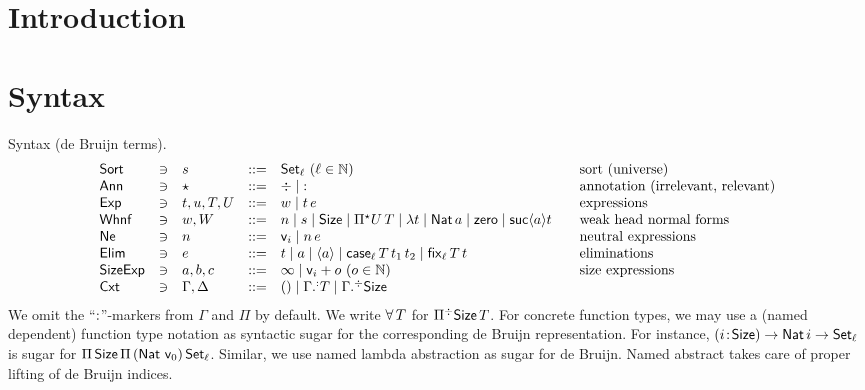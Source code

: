 \documentclass[acmlarge,review,anonymous]{acmart}\settopmatter{printfolios=true}
\begin{document}
\section{Introduction}
\label{sec:intro}

\newpage

\section{Syntax}

Syntax (de Bruijn terms).
\[
\begin{array}{lllrl@{\qquad}l}
\Sort & \ni & s
    & ::= & \Set[\ell] ~(\ell \in \NN)& \mbox{sort (universe)} \\
\Ann & \ni & \star & ::= & \erased \mid \noterased & \mbox{annotation (irrelevant, relevant)}\\
\Exp & \ni & t,u,T,U
    & ::= & w \mid t\,e & \mbox{expressions} \\
\Whnf & \ni & w, W
    & ::= & n \mid s \mid \Size \mid \epiT U T %
    \mid \lambda t%
    \mid \Nat a \mid \tzero \mid \suc a t & \mbox{weak head normal forms} \\ %
\Ne & \ni & n
    & ::= & \ind i \mid n \, e & \mbox{neutral expressions} \\
\Elim & \ni & e
    & ::= & t \mid a \mid \ann a \mid \case[\ell] T {t_1} t_2 \mid \fix[\ell] T t & \mbox{eliminations} \\
\SizeExp & \ni & a,b,c & ::= & \infty \mid \ind i + o ~(o \in \NN) & \mbox{size expressions} \\
\Cxt & \ni & \Gamma, \Delta & ::= & \cempty \mid \erext[\noterased] \Gamma T \mid \erext \Gamma \Size \\
\end{array}
\]
We omit the ``$\noterased$''-markers from $\Gamma$ and $\Pi$ by default.  We write $\forallT T$ for $\erpiT \Size T$.
For concrete function types, we may use a (named dependent) function type notation as syntactic sugar for the corresponding de Bruijn representation.  For instance, $\funT i \Size \Nat i \to \Set[\ell]$ is sugar for $\piT \Size \piT {(\Nat\,\ind 0)} \Set[\ell]$.  Similar, we use named lambda abstraction as sugar for de Bruijn.  Named abstract takes care of proper lifting of de Bruijn indices.
\end{document}
